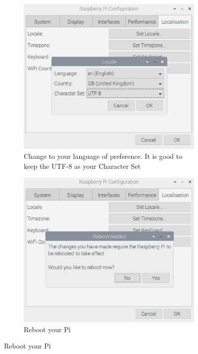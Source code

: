 \documentclass{article}
\begin{document}
\begin{figure}[h]
    \centering
    \begin{subfigure}[t]{0.49\textwidth}
        \centering
        \includegraphics[width=\textwidth]{lang2.png}
        \caption{Change to your language of preference. It is good to keep the UTF-8 as your Character Set}
    \end{subfigure}
    \begin{subfigure}[t]{0.49\textwidth}
        \centering
        \includegraphics[width=\textwidth]{lang3.png}
        \caption{Reboot your Pi}
    \end{subfigure}
\end{figure}
\end{document}
